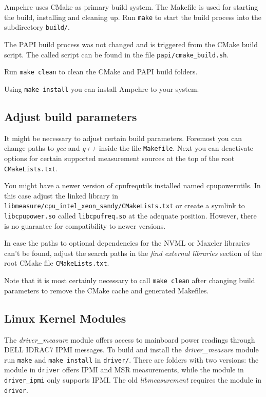 Ampehre uses CMake as primary build system.
The Makefile is used for starting the build, installing and cleaning up.
Run \verb+make+ to start the build process into the subdirectory \verb+build/+.

The PAPI build process was not changed and is triggered from the CMake build script.
The called script can be found in the file \verb+papi/cmake_build.sh+.

Run \verb+make clean+ to clean the CMake and PAPI build folders.

Using \verb+make install+ you can install Ampehre to your system.

\subsection{Adjust build parameters}

It might be necessary to adjust certain build parameters.
Foremost you can change paths to \emph{gcc} and \emph{g++} inside the file \verb+Makefile+.
Next you can deactivate options for certain supported measurement sources at the top of the root \verb+CMakeLists.txt+.

You might have a newer version of cpufrequtils installed named cpupowerutils.
In this case adjust the linked library in \\\verb+libmeasure/cpu_intel_xeon_sandy/CMakeLists.txt+ or create a symlink to \verb+libcpupower.so+ called \verb+libcpufreq.so+ at the adequate position.
However, there is no guarantee for compatibility to newer versions.

In case the paths to optional dependencies for the NVML or Maxeler libraries can't be found, adjust the search paths in the \emph{find external libraries} section of the root CMake file \verb+CMakeLists.txt+.

Note that it is most certainly necessary to call \verb+make clean+ after changing build parameters to remove the CMake cache and generated Makefiles.

\subsection{Linux Kernel Modules}

The \emph{driver\_measure} module offers access to mainboard power readings through DELL IDRAC7 IPMI messages.
To build and install the \emph{driver\_measure} module run \verb+make+ and \verb+make install+ in \verb+driver/+.
There are folders with two versions: the module in \verb+driver+ offers IPMI and MSR measurements, while the module in \verb+driver_ipmi+ only supports IPMI.
The old \emph{libmeasurement} requires the module in \verb+driver+.

